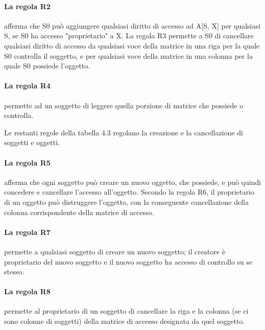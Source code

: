 \singlespacing

\paragraph{La regola R2} afferma che S0 può aggiungere qualsiasi diritto di accesso ad A[S, X] per qualsiasi S, se S0 ha accesso "proprietario" a X. La regola R3 permette a S0 di cancellare qualsiasi diritto di accesso da qualsiasi voce della matrice in una riga per la quale S0 controlla il soggetto, e per qualsiasi voce della matrice in una colonna per la quale S0 possiede l'oggetto.

\singlespacing

\paragraph{La regola R4} permette ad un soggetto di leggere quella porzione di matrice che possiede o controlla.

\singlespacing

Le restanti regole della tabella 4.3 regolano la creazione e la cancellazione di soggetti e oggetti.

\singlespacing

\paragraph{La regola R5} afferma che ogni soggetto può creare un nuovo oggetto, che possiede, e può quindi concedere e cancellare l'accesso all'oggetto. Secondo la regola R6, il proprietario di un oggetto può distruggere l'oggetto, con la conseguente cancellazione della colonna corrispondente della matrice di accesso.

\singlespacing

\paragraph{La regola R7} permette a qualsiasi soggetto di creare un nuovo soggetto; il creatore è proprietario del nuovo soggetto e il nuovo soggetto ha accesso di controllo su se stesso.

\singlespacing

\paragraph{La regola R8} permette al proprietario di un soggetto di cancellare la riga e la colonna (se ci sono colonne di soggetti) della matrice di accesso designata da quel soggetto.

